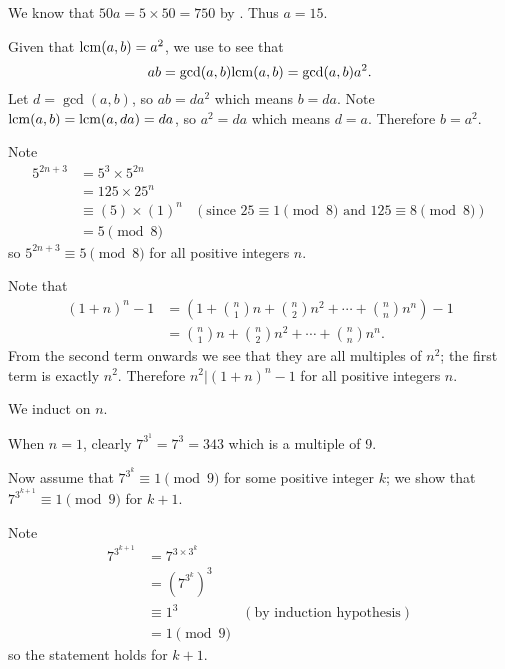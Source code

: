 \begin{questions}
    \item We know that $50a = 5 \times 50 = 750$ by . Thus $a = 15$.

    \item Given that $\mathrm{lcm}(a,b) = a^2$, we use  to see that
    \[
        ab = \gcd(a,b)\mathrm{lcm}(a,b) = \gcd(a,b)a^2.
    \]
    Let $d = \gcd(a,b)$, so $ab = da^2$ which means $b = da$. Note $\mathrm{lcm}(a,b) = \mathrm{lcm}(a, da) = da$, so $a^2 = da$ which means $d = a$. Therefore $b = a^2$.

    \item Note
    \begin{align*}
        5^{2n+3} &= 5^3 \times 5^{2n}\\
        &= 125 \times 25^n \\
        &\equiv (5) \times (1)^n & (\text{since } 25 \equiv 1 \pmod8 \text{ and } 125 \equiv 8 \pmod8)\\
        &= 5 \pmod8
    \end{align*}
    so $5^{2n+3} \equiv 5 \pmod8$ for all positive integers $n$.

    \item Note that
    \begin{align*}
        (1+n)^n - 1 &= \left(1 + {n \choose 1}n + {n \choose 2}n^2 + \cdots + {n \choose n}n^n\right) - 1\\
        &= {n \choose 1}n + {n \choose 2}n^2 + \cdots + {n \choose n}n^n.
    \end{align*}
    From the second term onwards we see that they are all multiples of $n^2$; the first term is exactly $n^2$. Therefore $n^2 \vert (1+n)^n - 1$ for all positive integers $n$.

    \item We induct on $n$.

    When $n = 1$, clearly $7^{3^1} = 7^3 = 343$ which is a multiple of 9.

    Now assume that $7^{3^k} \equiv 1 \pmod9$ for some positive integer $k$; we show that $7^{3^{k+1}} \equiv 1 \pmod9$ for $k + 1$.

    Note
    \begin{align*}
        7^{3^{k+1}} &= 7^{3\times3^k}\\
        &= \left(7^{3^k}\right)^3\\
        &\equiv 1^3 & (\text{by induction hypothesis})\\
        &= 1 \pmod9
    \end{align*}
    so the statement holds for $k+1$.


\end{questions}
